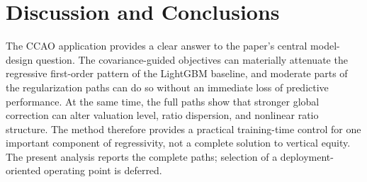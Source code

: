 \documentclass[10pt]{article}
\theoremstyle{definition}
\newcommand{\1}{\mathbf{1}}
\newcommand{\oldtext}[1]{\textcolor{blue}{\sout{#1}}}
\newcommand{\newtext}[1]{\textcolor{impGreen}{#1}}
\begin{document}

\section{Discussion and Conclusions}
\label{sec:discussion}

\newtext{The CCAO application provides a clear answer to the paper's central model-design question. The covariance-guided objectives can materially attenuate the regressive first-order pattern of the LightGBM baseline, and moderate parts of the regularization paths can do so without an immediate loss of predictive performance. At the same time, the full paths show that stronger global correction can alter valuation level, ratio dispersion, and nonlinear ratio structure. The method therefore provides a practical training-time control for one important component of regressivity, not a complete solution to vertical equity. The present analysis reports the complete paths; selection of a deployment-oriented operating point is deferred.}
\end{document}
